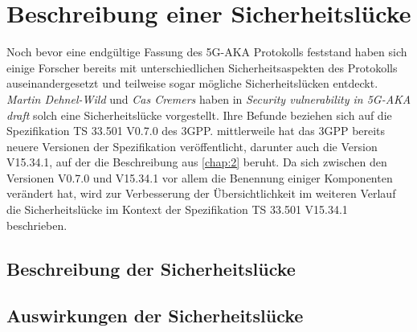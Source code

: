 \chapter{Beschreibung einer Sicherheitsl\"ucke}
\label{chap:4}

Noch bevor eine endgültige Fassung des 5G-AKA Protokolls feststand haben sich einige Forscher bereits mit unterschiedlichen Sicherheitsaspekten des Protokolls auseinandergesetzt und teilweise sogar mögliche Sicherheitslücken entdeckt.
\textit{Martin Dehnel-Wild} und \textit{Cas Cremers} haben in \textit{Security vulnerability in 5G-AKA draft} solch eine Sicherheitslücke vorgestellt. %
Ihre Befunde beziehen sich auf die Spezifikation TS 33.501 V0.7.0 des 3GPP. %
mittlerweile hat das 3GPP bereits neuere Versionen der Spezifikation veröffentlicht, darunter auch die Version V15.34.1, auf der die Beschreibung aus \cref{chap:2} beruht. %
Da sich zwischen den Versionen V0.7.0 und V15.34.1 vor allem die Benennung einiger Komponenten verändert hat, wird zur Verbesserung der Übersichtlichkeit im weiteren Verlauf die Sicherheitslücke im Kontext der Spezifikation TS 33.501 V15.34.1 beschrieben.

\section{Beschreibung der Sicherheitslücke}

\section{Auswirkungen der Sicherheitslücke}